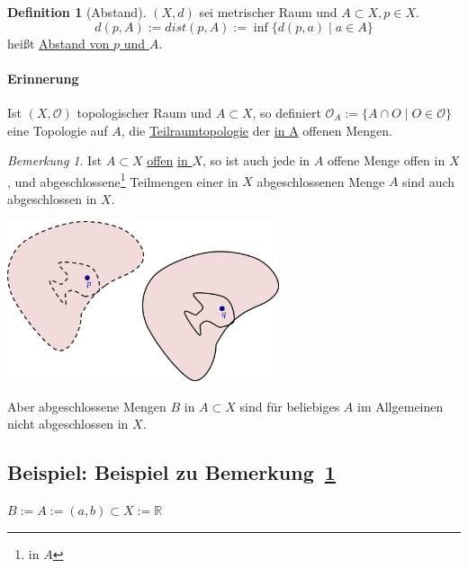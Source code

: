 \documentclass[a4paper,11pt,notitlepage]{report}
\theoremstyle{remark}
\newtheorem{remark}{Bemerkung}[chapter]
\theoremstyle{definition}
\newtheorem{definition}{Definition}[chapter]
\newcommand{\R}{{\ensuremath{\mathbb{R}}}}
\newcommand{\OO}{{\ensuremath{\mathcal{O}}}}
\newenvironment{bsp}[1]
{
\setlength{\fboxsep}{10pt}
\subsection*{Beispiel: #1}
\begin{upshape}
}
{
\end{upshape}
}
\begin{document}
\begin{definition}[Abstand]
	$(X,d)$ sei metrischer Raum und $A \subset X, p \in X$.
	$$d(p,A) := dist(p,A):= \inf \{d(p,a) \mid a\in A \}$$
	heißt \underline{Abstand von $p$ und $A$}.
\end{definition}

\paragraph{Erinnerung}
Ist $(X, \OO)$ topologischer Raum und $A \subset X$, so definiert
$\OO_A := \{ A \cap O \mid O \in \OO \}$ eine Topologie auf $A$, die
 \underline{Teilraumtopologie} der \underline{in A} offenen Mengen.
 
\begin{remark}
	\label{offenAbgeschlossen}
	Ist $A \subset X$ \underline{offen} \underline{\underline{in $X$}}, so ist auch jede in $A$ offene Menge offen in $X$, und abgeschlossene\footnote{in $A$} Teilmengen einer in $X$ abgeschlossenen Menge $A$ sind auch abgeschlossen in $X$.
		
		\begin{center}
	\includegraphics[width=0.6\textwidth]{images/offen_abgeschlossen.jpg}
	\end{center}
	Aber abgeschlossene Mengen $B$ in $A \subset X$ sind für beliebiges $A$ im Allgemeinen nicht abgeschlossen in $X$.
\end{remark}

\begin{bsp}{Beispiel zu Bemerkung~\ref{offenAbgeschlossen}}
	$B := A := (a,b) \subset X := \R$
\end{bsp}
\end{document}
